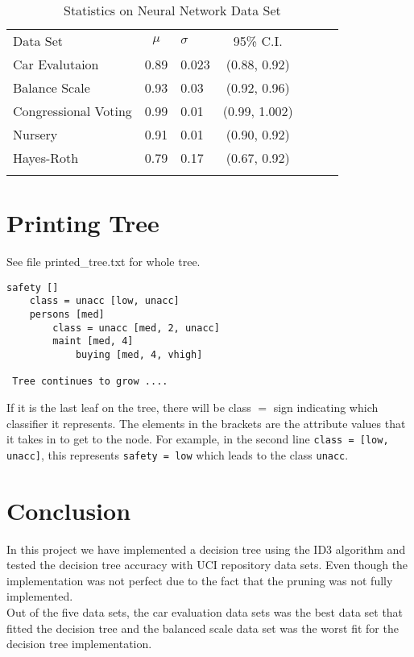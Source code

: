 \documentclass{sig-alternate-05-2015}
\begin{document}
\begin{table}[!htbp]
\begin{center}
\begin{tabular}{ V{2}cV{2}c|c|cV{2} } 
Data Set & $\mu$ & $\sigma$ & 95\% C.I.\\
Car Evalutaion & 0.89 & 0.023 & (0.88, 0.92)\\\hline
Balance Scale & 0.93 & 0.03 & (0.92, 0.96)\\\hline 
Congressional Voting  & 0.99 & 0.01 & (0.99, 1.002)\\\hline 
Nursery & 0.91 & 0.01 & (0.90, 0.92)\\\hline  
Hayes-Roth & 0.79 & 0.17 & (0.67, 0.92)\\
\end{tabular}
\caption{Statistics on Neural Network Data Set}
\label{table:kysymys}
\end{center}
\label{table:kysymys}
\end{table}


\section{Printing Tree}
See file printed\_tree.txt for whole tree.\\
\begin{lstlisting}
safety []
    class = unacc [low, unacc]
    persons [med]
        class = unacc [med, 2, unacc]
        maint [med, 4]
            buying [med, 4, vhigh]
            
 Tree continues to grow ....
\end{lstlisting}

If it is the last leaf on the tree, there will be class $=$ sign indicating which classifier it represents. The elements in the brackets are the attribute values that it takes in to get to the node. For example, in the second line \texttt{class = [low, unacc]}, this represents \texttt{safety = low} which leads to the class \texttt{unacc}.
\section{Conclusion}
In this project we have implemented a decision tree using the ID3 algorithm and tested the decision tree accuracy with UCI repository data sets. Even though the implementation was not perfect due to the fact that the pruning was not fully implemented.\\
\indent Out of the five data sets, the car evaluation data sets was the best data set that fitted the decision tree and the balanced scale data set was the worst fit for the decision tree implementation.
\end{document}
